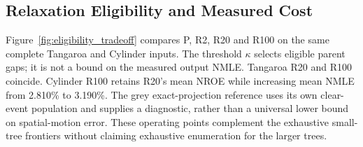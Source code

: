 \subsection{Relaxation Eligibility and Measured Cost}

Figure~\ref{fig:eligibility_tradeoff} compares P, R2, R20 and R100 on the same complete Tangaroa and Cylinder inputs. The threshold $\kappa$ selects eligible parent gaps; it is not a bound on the measured output NMLE. Tangaroa R20 and R100 coincide. Cylinder R100 retains R20's mean NROE while increasing mean NMLE from 2.810\% to 3.190\%. The grey exact-projection reference uses its own clear-event population and supplies a diagnostic, rather than a universal lower bound on spatial-motion error. These operating points complement the exhaustive small-tree frontiers without claiming exhaustive enumeration for the larger trees.
